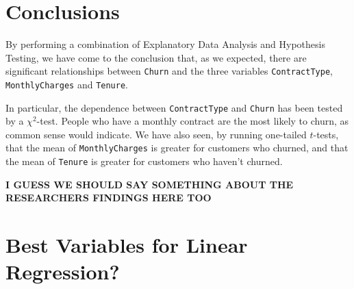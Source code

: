 \documentclass[man, floatsintext]{apa6}
\begin{document}
\section{Conclusions}

By performing a combination of Explanatory Data Analysis and Hypothesis Testing, we have come to the conclusion that, as we expected, there are significant relationships between \texttt{Churn} and the three variables \texttt{ContractType}, \texttt{MonthlyCharges} and \texttt{Tenure}. 

In particular, the dependence between \texttt{ContractType} and \texttt{Churn} has been tested by a $\chi^2$-test. People who have a monthly contract are the most likely to churn, as common sense would indicate. We have also seen, by running one-tailed $t$-tests, that the mean of \texttt{MonthlyCharges} is greater for customers who churned, and that the mean of \texttt{Tenure} is greater for customers who haven't churned. 

\textbf{I GUESS WE SHOULD SAY SOMETHING ABOUT THE RESEARCHERS FINDINGS HERE TOO}

\appendix
\section{Best Variables for Linear Regression?}
\newpage
\printbibliography
\end{document}
